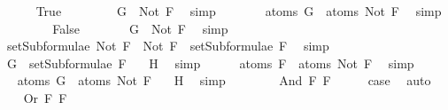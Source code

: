 \begin{isabellebody}
\ \ \ \ \isamarkupfalse%
\ True\ \isanewline
\ \ \ \ \isamarkupfalse%
\ \isamarkupfalse%
\ {\isachardoublequoteopen}G\ {\isacharequal}\ Not\ F{\isachardoublequoteclose}\ \isamarkupfalse%
\ simp\isanewline
\ \ \ \ \isamarkupfalse%
\ \isamarkupfalse%
\ {\isachardoublequoteopen}atoms\ G\ {\isasymsubseteq}\ atoms\ {\isacharparenleft}Not\ F{\isacharparenright}{\isachardoublequoteclose}\ \isamarkupfalse%
\ simp\isanewline
\ \ \isamarkupfalse%
\isanewline
\ \ \ \ \isamarkupfalse%
\ False\isanewline
\ \ \ \ \isamarkupfalse%
\ \isamarkupfalse%
\ {}{\isacharcolon}{\isachardoublequoteopen}G\ {\isasymnoteq}\ Not\ F{\isachardoublequoteclose}\ \isamarkupfalse%
\ simp\isanewline
\ \ \ \ \isamarkupfalse%
\ {\isachardoublequoteopen}setSubformulae\ {\isacharparenleft}Not\ F{\isacharparenright}\ {\isacharequal}\ {\isacharbraceleft}Not\ F{\isacharbraceright}\ {\isasymunion}\ setSubformulae\ F{\isachardoublequoteclose}\ \isamarkupfalse%
\ simp\isanewline
\ \ \ \ \isamarkupfalse%
\ \isamarkupfalse%
\ {}{\isacharcolon}{\isachardoublequoteopen}G\ {\isasymin}\ setSubformulae\ F{\isachardoublequoteclose}\ \isamarkupfalse%
\ {}\ H{}\ \isamarkupfalse%
\ simp\isanewline
\ \ \ \ \isamarkupfalse%
\ {\isachardoublequoteopen}atoms\ F\ {\isacharequal}\ atoms\ {\isacharparenleft}Not\ F{\isacharparenright}{\isachardoublequoteclose}\ \isamarkupfalse%
\ simp\isanewline
\ \ \ \ \isamarkupfalse%
\ \isamarkupfalse%
\ {\isachardoublequoteopen}atoms\ G\ {\isasymsubseteq}\ atoms\ {\isacharparenleft}Not\ F{\isacharparenright}{\isachardoublequoteclose}\ \isamarkupfalse%
\ {}\ H{}\ \isamarkupfalse%
\ simp\isanewline
\ \ \isamarkupfalse%
\ \isanewline
{}\isamarkupfalse%
\isanewline
\ \ \isamarkupfalse%
\ {\isacharparenleft}And\ F{}\ F{}{\isacharparenright}\isanewline
\ \ \isamarkupfalse%
\ \isamarkupfalse%
\ {\isacharquery}case\ \isamarkupfalse%
\ auto\isanewline
{}\isamarkupfalse%
\isanewline
\ \ \isamarkupfalse%
\ {\isacharparenleft}Or\ F{}\ F{}{\isacharparenright}\isanewline

\end{isabellebody}
